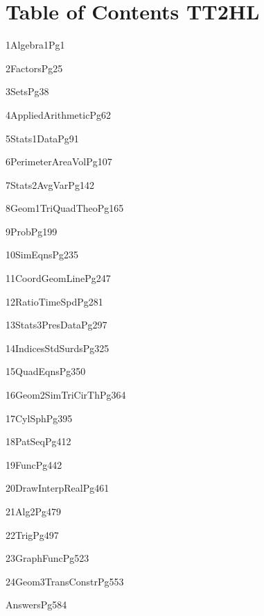 \documentclass{article}
\begin{document}
\section*{Table of Contents TT2HL}
\LARGE

1Algebra1Pg1

2FactorsPg25

3SetsPg38

4AppliedArithmeticPg62

5Stats1DataPg91

6PerimeterAreaVolPg107

7Stats2AvgVarPg142

8Geom1TriQuadTheoPg165

9ProbPg199

10SimEqnsPg235

11CoordGeomLinePg247

12RatioTimeSpdPg281

13Stats3PresDataPg297

14IndicesStdSurdsPg325

15QuadEqnsPg350

16Geom2SimTriCirThPg364

17CylSphPg395

18PatSeqPg412

19FuncPg442

20DrawInterpRealPg461

21Alg2Pg479

22TrigPg497

23GraphFuncPg523

24Geom3TransConstrPg553

AnswersPg584
\end{document}
